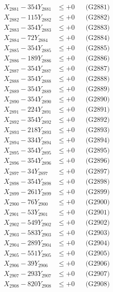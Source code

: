 \documentclass[a4paper,10pt]{article}
\begin{document}
{\begin{align}
\allowbreak
X_{2881} - 354Y_{2881} &\leq +0 && \text{(G2881)} \\
X_{2882} - 115Y_{2882} &\leq +0 && \text{(G2882)} \\
X_{2883} - 354Y_{2883} &\leq +0 && \text{(G2883)} \\
X_{2884} - 72Y_{2884} &\leq +0 && \text{(G2884)} \\
X_{2885} - 354Y_{2885} &\leq +0 && \text{(G2885)} \\
X_{2886} - 189Y_{2886} &\leq +0 && \text{(G2886)} \\
X_{2887} - 354Y_{2887} &\leq +0 && \text{(G2887)} \\
X_{2888} - 354Y_{2888} &\leq +0 && \text{(G2888)} \\
X_{2889} - 354Y_{2889} &\leq +0 && \text{(G2889)} \\
X_{2890} - 354Y_{2890} &\leq +0 && \text{(G2890)} \\
\allowbreak
X_{2891} - 224Y_{2891} &\leq +0 && \text{(G2891)} \\
X_{2892} - 354Y_{2892} &\leq +0 && \text{(G2892)} \\
X_{2893} - 218Y_{2893} &\leq +0 && \text{(G2893)} \\
X_{2894} - 334Y_{2894} &\leq +0 && \text{(G2894)} \\
X_{2895} - 354Y_{2895} &\leq +0 && \text{(G2895)} \\
X_{2896} - 354Y_{2896} &\leq +0 && \text{(G2896)} \\
X_{2897} - 34Y_{2897} &\leq +0 && \text{(G2897)} \\
X_{2898} - 354Y_{2898} &\leq +0 && \text{(G2898)} \\
X_{2899} - 261Y_{2899} &\leq +0 && \text{(G2899)} \\
X_{2900} - 76Y_{2900} &\leq +0 && \text{(G2900)} \\
\allowbreak
X_{2901} - 53Y_{2901} &\leq +0 && \text{(G2901)} \\
X_{2902} - 549Y_{2902} &\leq +0 && \text{(G2902)} \\
X_{2903} - 583Y_{2903} &\leq +0 && \text{(G2903)} \\
X_{2904} - 289Y_{2904} &\leq +0 && \text{(G2904)} \\
X_{2905} - 551Y_{2905} &\leq +0 && \text{(G2905)} \\
X_{2906} - 39Y_{2906} &\leq +0 && \text{(G2906)} \\
X_{2907} - 293Y_{2907} &\leq +0 && \text{(G2907)} \\
X_{2908} - 820Y_{2908} &\leq +0 && \text{(G2908)} \\

\end{align}}
\end{document}
